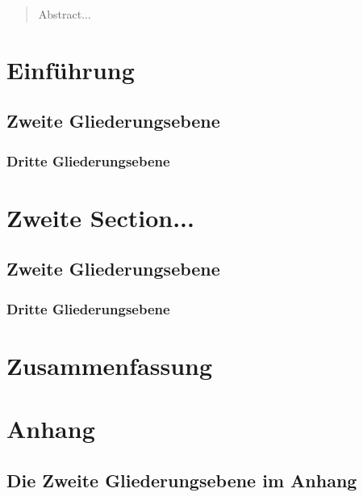 \documentclass[a4paper, 11pt, DIV=11, listof=numbered, numbers=noenddot]{scrartcl}
\begin{document}
	\newpage
	
	\maketitle
	
	\begin{abstract}
		Abstract...

	\end{abstract}
	
	\section{Einführung}
		
	\subsection{Zweite Gliederungsebene}
	
	\subsubsection{Dritte Gliederungsebene}
		
	\section{Zweite Section...}
		
	\subsection{Zweite Gliederungsebene}

	\subsubsection{Dritte Gliederungsebene}
	
	\section{Zusammenfassung}
	
	
	\newpage
	
	
	
	
	
	\appendix	%
	\newpage
	
	
	\section{Anhang}
	
	\subsection{Die Zweite Gliederungsebene im Anhang}
	
	
\end{document}
